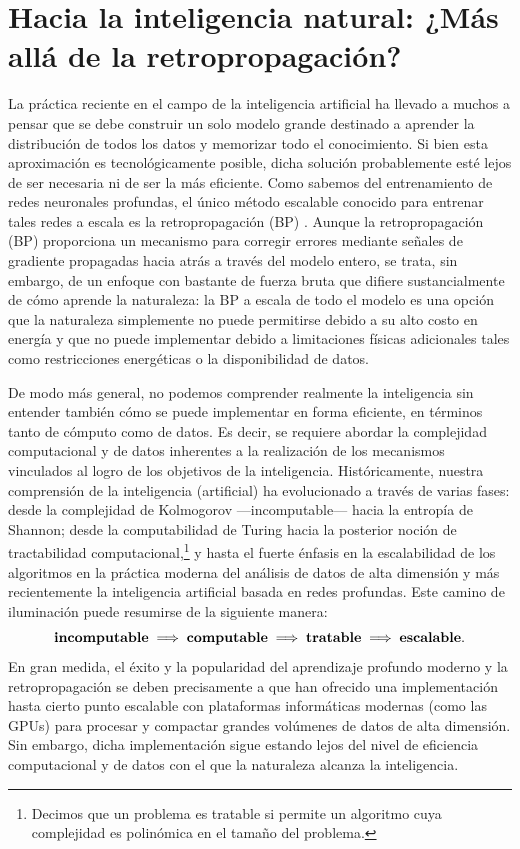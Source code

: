 \documentclass[../../book-main_es.tex]{subfiles}
\begin{document}
\section{Hacia la inteligencia natural: ¿Más allá de la retropropagación?}
La práctica reciente en el campo de la inteligencia artificial ha llevado a muchos a pensar que 
se debe construir un solo modelo grande destinado a aprender la distribución de todos los datos y 
memorizar todo el conocimiento. Si bien esta aproximación es tecnológicamente posible, dicha solución 
probablemente esté lejos de ser necesaria ni de ser la más eficiente. Como sabemos del entrenamiento de redes 
neuronales profundas, el único método escalable conocido para entrenar tales redes a escala 
es la retropropagación (BP) \citep{Back-Prop}. Aunque la retropropagación (BP) proporciona un 
mecanismo para corregir errores mediante señales de gradiente propagadas hacia atrás a través del 
modelo entero, se trata, sin embargo, de un enfoque con bastante de fuerza bruta que difiere 
sustancialmente de cómo aprende la naturaleza: la BP a escala de todo el modelo es una opción que la naturaleza 
simplemente no puede permitirse debido a su alto costo en energía y que no puede implementar 
debido a limitaciones físicas adicionales tales como restricciones energéticas o la disponibilidad de datos.

De modo más general, no podemos comprender realmente la inteligencia sin entender también cómo se 
puede implementar en forma eficiente, en términos tanto de cómputo como de datos. Es decir, se requiere abordar la complejidad computacional 
y de datos inherentes a la realización de los mecanismos vinculados al logro de los objetivos de la inteligencia.
Históricamente, nuestra comprensión de la inteligencia (artificial) ha evolucionado a través de varias fases: 
desde la complejidad de Kolmogorov ---incomputable--- hacia la entropía de Shannon; desde la computabilidad 
de Turing hacia la posterior noción de tractabilidad computacional,\footnote{Decimos que un problema es tratable
    si permite un algoritmo cuya complejidad es polinómica en el tamaño
del problema.} y hasta el fuerte énfasis en la escalabilidad de los algoritmos
en la práctica moderna del análisis de datos de alta dimensión
\citep{Wright-Ma-2022} y más recientemente la inteligencia artificial basada en redes profundas. 
Este camino de iluminación puede resumirse de la siguiente manera:
\begin{equation}
    \text{\textbf{incomputable}} \;
    \Longrightarrow \; \text{\textbf{computable}} \;
    \Longrightarrow \; \text{\textbf{tratable}} \; \Longrightarrow \;
    \text{\textbf{escalable}}.
\end{equation}
En gran medida, el éxito y la popularidad del aprendizaje profundo moderno y
la retropropagación se deben precisamente a que han ofrecido una implementación
hasta cierto punto escalable con plataformas informáticas modernas (como las GPUs) para
procesar y compactar grandes volúmenes de datos de alta dimensión. Sin embargo, dicha
implementación sigue estando lejos del nivel de eficiencia computacional y de datos con el que la naturaleza
alcanza la inteligencia.
\end{document}
